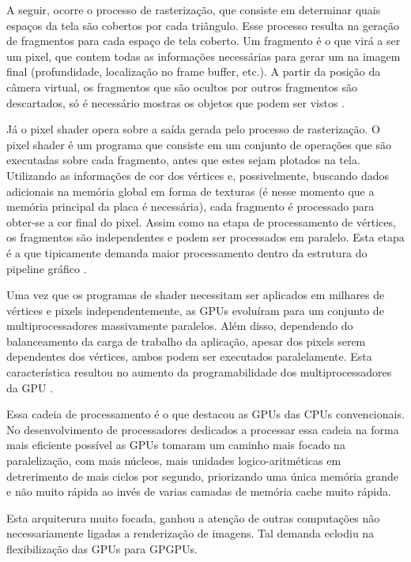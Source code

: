   A seguir, ocorre o processo de rasterização, que consiste em determinar quais espaços da tela são cobertos por cada triângulo. Esse processo resulta na geração de fragmentos para cada espaço de tela coberto. Um fragmento é o que virá a ser um pixel, que contem todas as informações necessárias para gerar um na imagem final (profundidade, localização no frame buffer, etc.). A partir da posição da câmera virtual, os fragmentos que são ocultos por outros fragmentos são descartados, só é necessário mostras os objetos que podem ser vistos \citep{gpu-comp:08}.

  Já o pixel shader opera sobre a saída gerada pelo processo de rasterização. O pixel shader é um programa que consiste em um conjunto de operações que são executadas sobre cada fragmento, antes que estes sejam plotados na tela. Utilizando as informações de cor dos vértices e, possivelmente, buscando dados adicionais na memória global em forma de texturas (é nesse momento que a memória principal da placa é necessária), cada fragmento é processado para obter-se a cor final do pixel. Assim como na etapa de processamento de vértices, os fragmentos são independentes e podem ser processados em paralelo. Esta etapa é a que tipicamente demanda maior processamento dentro da estrutura do pipeline gráfico \citep{gpu-comp:08}.

  Uma vez que os programas de shader necessitam ser aplicados em milhares de vértices e pixels independentemente, as GPUs evoluíram para um conjunto de multiprocessadores massivamente paralelos. Além disso, dependendo do balanceamento da carga de trabalho da aplicação, apesar dos pixels serem dependentes dos vértices, ambos podem ser executados paralelamente. Esta característica resultou no aumento da programabilidade dos multiprocessadores da GPU \citep{massively:16}.

  Essa cadeia de processamento é o que destacou as GPUs das CPUs convencionais. No desenvolvimento de processadores dedicados a processar essa cadeia na forma mais eficiente possível as GPUs tomaram um caminho mais focado na paralelização, com mais núcleos, mais unidades logico-aritméticas em detrerimento de mais ciclos por segundo, priorizando uma única memória grande e não muito rápida ao invés de varias camadas de memória cache muito rápida.

  Esta arquiterura muito focada, ganhou a atenção de outras computações não necessariamente ligadas a renderização de imagens. Tal demanda eclodiu na flexibilização das GPUs para GPGPUs.


